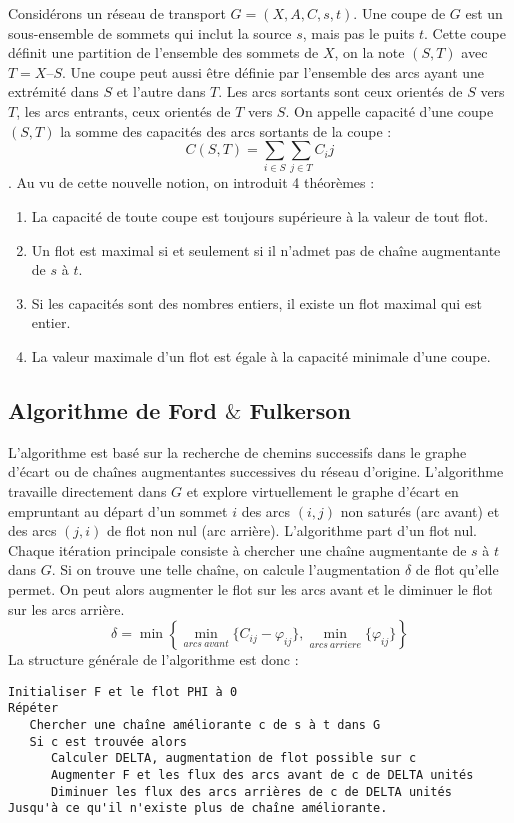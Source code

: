 \documentclass{article}
\begin{document}
Considérons un réseau de transport $G=(X,A,C,s,t)$. Une coupe de $G$ est un sous-ensemble de sommets qui inclut la source $s$, mais pas le puits $t$. Cette coupe définit une 
partition de l’ensemble des sommets de $X$, on la note $(S,T)$ avec $T = X – S$. Une coupe peut aussi être définie par l’ensemble des arcs ayant une extrémité dans $S$ et 
l’autre dans $T$. Les arcs sortants sont ceux orientés de $S$ vers $T$, les arcs entrants, ceux orientés de $T$ vers $S$. On appelle capacité d’une coupe $(S,T)$ la somme des 
capacités des arcs sortants de la coupe : $$ C(S,T) = \sum_{i\in S}\sum_{j\in T} C_ij $$. Au vu de cette nouvelle notion, on introduit 4 théorèmes :
\begin{enumerate}
\item La capacité de toute coupe est toujours supérieure à la valeur de tout flot.
\item Un flot est maximal si et seulement si il n’admet pas de chaîne augmentante de $s$ à $t$.
\item Si les capacités sont des nombres entiers, il existe un flot maximal qui est entier.
\item La valeur maximale d’un flot est égale à la capacité minimale d’une coupe.
\end{enumerate}
\newpage
\subsection{Algorithme de Ford $\&$ Fulkerson}

L’algorithme est basé sur la recherche de chemins successifs dans le graphe d’écart ou de chaînes augmentantes successives du réseau d’origine. L’algorithme travaille directement 
dans $G$ et explore virtuellement le graphe d’écart en empruntant au départ d’un sommet $i$ des arcs $(i,j)$ non saturés (arc avant) et des arcs $(j,i)$ de flot non nul
(arc arrière). L’algorithme part d’un flot nul. Chaque itération principale consiste à chercher une chaîne augmentante de $s$ à $t$ dans $G$. Si on trouve une telle chaîne, on 
calcule l’augmentation $\delta$ de flot qu’elle permet. On peut alors augmenter le flot sur les arcs avant et le diminuer le flot sur les arcs arrière.
$$ \delta = \min{\left\{  \min_{arcs\ avant}{\{ C_{ij} -\varphi_{ij} \}}, \min_{arcs\ arriere}{\{ \varphi_{ij} \}} \right\}}$$
La structure générale de l'algorithme est donc :
\begin{verbatim}
Initialiser F et le flot PHI à 0
Répéter
   Chercher une chaîne améliorante c de s à t dans G
   Si c est trouvée alors
      Calculer DELTA, augmentation de flot possible sur c
      Augmenter F et les flux des arcs avant de c de DELTA unités
      Diminuer les flux des arcs arrières de c de DELTA unités
Jusqu'à ce qu'il n'existe plus de chaîne améliorante.
\end{verbatim}
\end{document}
